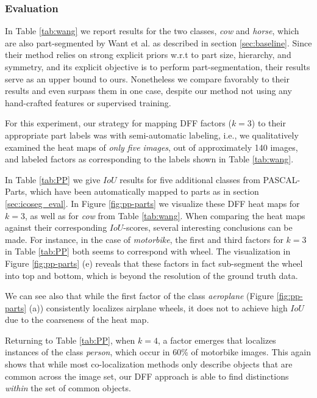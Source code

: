 \documentclass[runningheads]{llncs}
\begin{document}
	\subsubsection{Evaluation}
	
	In Table \ref{tab:wang} we report results for the two classes, \emph{cow} and \emph{horse}, which are also part-segmented by Want et al. as described in section \ref{sec:baseline}. Since their method relies on strong explicit priors w.r.t to part size, hierarchy, and symmetry, and its explicit objective is to perform part-segmentation, their results serve as an upper bound to ours. Nonetheless we compare favorably to their results and even surpass them in one case, despite our method not using any hand-crafted features or supervised training.
	
	For this experiment, our strategy for mapping DFF factors ($k=3$) to their appropriate part labels was with semi-automatic labeling, i.e., we qualitatively examined the heat maps of \emph{only five images}, out of approximately 140 images, and labeled factors as corresponding to the labels shown in Table \ref{tab:wang}.
	
	In Table \ref{tab:PP} we give $IoU$ results for five additional classes from PASCAL-Parts, which have been automatically mapped to parts as in section \ref{sec:icoseg_eval}.
	In Figure \ref{fig:pp-parts} we visualize these DFF heat maps for $k=3$, as well as for \emph{cow} from Table \ref{tab:wang}. When comparing the heat maps against their corresponding $IoU$-scores, several interesting conclusions can be made. For instance, in the case of \emph{motorbike}, the first and third factors for $k=3$ in Table \ref{tab:PP} both seems to correspond with wheel. The visualization in Figure \ref{fig:pp-parts} (e) reveals that these factors in fact sub-segment the wheel into top and bottom, which is beyond the resolution of the ground truth data.
	
	We can see also that while the first factor of the class \emph{aeroplane} (Figure \ref{fig:pp-parts} (a)) consistently localizes airplane wheels, it does not to achieve high $IoU$ due to the coarseness of the heat map. 

	 Returning to Table \ref{tab:PP}, when $k=4$, a factor emerges that localizes instances of the class \emph{person}, which occur in 60\% of motorbike images. This again shows that while most co-localization methods only describe objects that are common across the image set, our DFF approach is able to find distinctions \emph{within} the set of common objects.
\end{document}
